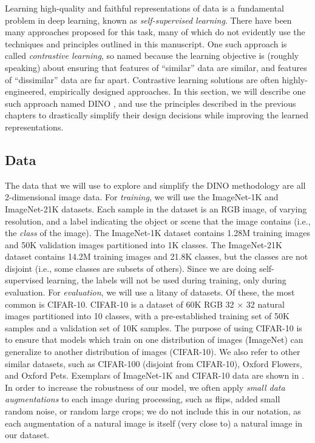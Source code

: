 \documentclass[../../book-main.tex]{subfiles}
\begin{document}
Learning high-quality and faithful representations of data is a fundamental problem in deep learning, known as \textit{self-supervised learning}. There have been many approaches proposed for this task, many of which do not evidently use the techniques and principles outlined in this manuscript. One such approach is called \textit{contrastive learning}, so named because the learning objective is (roughly speaking) about ensuring that features of ``similar'' data are similar, and features of ``dissimilar'' data are far apart. Contrastive learning solutions are often highly-engineered, empirically designed approaches. In this section, we will describe one such approach named DINO \citep{caron2021emerging}, and use the principles described in the previous chapters to drastically simplify their design decisions while improving the learned representations.

\subsection{Data}\label{sub:contrastive_learning_data}

The data that we will use to explore and simplify the DINO methodology are all 2-dimensional image data. For \textit{training}, we will use the ImageNet-1K and ImageNet-21K datasets. Each sample in the dataset is an RGB image, of varying resolution, and a label indicating the object or scene that the image contains (i.e., the \textit{class} of the image). The ImageNet-1K dataset contains 1.28M training images and 50K validation images partitioned into 1K classes. The ImageNet-21K dataset contains 14.2M training images and 21.8K classes, but the classes are not disjoint (i.e., some classes are subsets of others). Since we are doing self-supervised learning, the labels will not be used during training, only during evaluation. For \textit{evaluation}, we will use a litany of datasets. Of these, the most common is CIFAR-10. CIFAR-10 is a dataset of 60K RGB 32 \(\times\) 32 natural images partitioned into 10 classes, with a pre-established training set of 50K samples and a validation set of 10K samples. The purpose of using CIFAR-10 is to ensure that models which train on one distribution of images (ImageNet) can generalize to another distribution of images (CIFAR-10). We also refer to other similar datasets, such as CIFAR-100 (disjoint from CIFAR-10), Oxford Flowers, and Oxford Pets. Exemplars of ImageNet-1K and CIFAR-10 data are shown in . In order to increase the robustness of our model, we often apply \textit{small data augmentations} to each image during processing, such as flips, added small random noise, or random large crops; we do not include this in our notation, as each augmentation of a natural image is itself (very close to) a natural image in our dataset.
\end{document}
